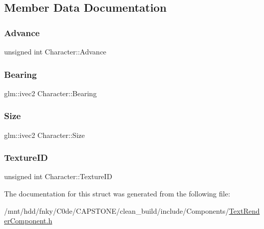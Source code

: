 \subsection{Member Data Documentation}
\mbox{\label{structCharacter_a5338c0800545802a63f8e4945573cbe7}} 
\subsubsection{\texorpdfstring{Advance}{Advance}}
{\footnotesize\ttfamily unsigned int Character\+::\+Advance}

\mbox{\label{structCharacter_afef98bf9c7f5313d96476f6f3f85f872}} 
\subsubsection{\texorpdfstring{Bearing}{Bearing}}
{\footnotesize\ttfamily glm\+::ivec2 Character\+::\+Bearing}

\mbox{\label{structCharacter_aaaa598050e0ef590fe6903fd2bab40b8}} 
\subsubsection{\texorpdfstring{Size}{Size}}
{\footnotesize\ttfamily glm\+::ivec2 Character\+::\+Size}

\mbox{\label{structCharacter_a411760a6a33f2cb54dd6a0138e038a46}} 
\subsubsection{\texorpdfstring{Texture\+ID}{TextureID}}
{\footnotesize\ttfamily unsigned int Character\+::\+Texture\+ID}



The documentation for this struct was generated from the following file\+:\begin{DoxyCompactItemize}
\item 
/mnt/hdd/fnky/\+C0de/\+C\+A\+P\+S\+T\+O\+N\+E/clean\+\_\+build/include/\+Components/\hyperlink{TextRenderComponent_8h}{Text\+Render\+Component.\+h}\end{DoxyCompactItemize}
